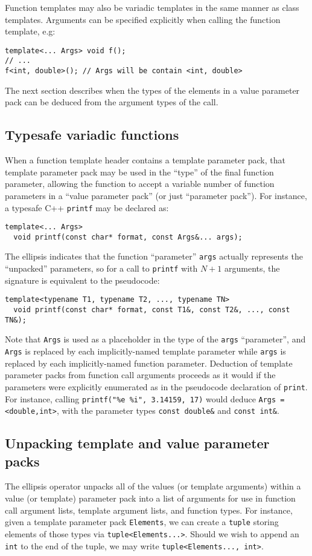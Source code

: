 \documentclass{article}
\begin{document}
Function templates may also be variadic templates in the same manner
as class templates.  Arguments can be specified explicitly when
calling the function template, e.g:

\begin{verbatim}
template<... Args> void f();
// ... 
f<int, double>(); // Args will be contain <int, double>
\end{verbatim}
The next section describes when the types of the elements in 
a value parameter pack can be deduced from the argument types
of the call. 

\subsection{Typesafe variadic functions}
When a function template header contains a template parameter pack,
that template parameter pack may be used in the ``type'' of the final
function parameter, allowing the function to accept a variable number
of function parameters in a ``value parameter pack'' (or just
``parameter pack''). For instance, a typesafe C++ {\tt printf} may
be declared as:
\begin{verbatim}
template<... Args>
  void printf(const char* format, const Args&... args);
\end{verbatim}

\noindent The ellipsis indicates that the function ``parameter''
\texttt{args}
actually represents the ``unpacked'' parameters, so for a call to
\texttt{printf} with $N+1$ arguments, the signature is equivalent to
the pseudocode:

\begin{verbatim}
template<typename T1, typename T2, ..., typename TN>
  void printf(const char* format, const T1&, const T2&, ..., const TN&);
\end{verbatim}

\noindent 
Note that \texttt{Args} is used as a placeholder in the type of the
\texttt{args} ``parameter'', and \texttt{Args} is replaced by each
implicitly-named template parameter while \texttt{args} is replaced by
each implicitly-named function parameter. Deduction of template
parameter packs from function call arguments proceeds as it would if
the parameters were explicitly enumerated as in the pseudocode
declaration of \texttt{print}. For instance, calling
\texttt{printf("\%e \%i", 3.14159, 17)} would deduce \texttt{Args =
  <double,int>}, with the parameter types \texttt{const double\&} and
\texttt{const int\&}.

\subsection{Unpacking template and value parameter packs}
The ellipsis operator unpacks all of the values (or template
arguments) within a value (or template) parameter pack into a list of
arguments for use in function call argument lists, template argument
lists, and function types. For instance, given a template parameter pack
{\tt Elements}, we can create a {\tt tuple} storing elements of those
types via {\tt tuple<Elements...>}. Should we wish to append an {\tt int}
to the end of the tuple, we may write {\tt tuple<Elements..., int>}.
\end{document}
